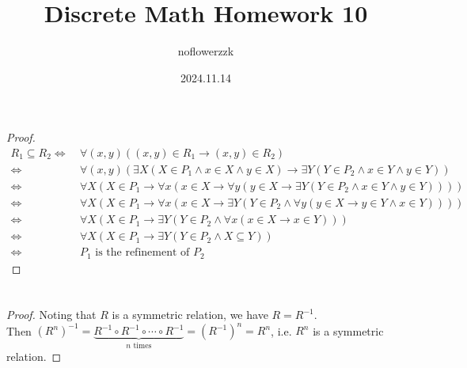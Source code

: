 \documentclass{article}
\title{Discrete Math Homework 10}
\author{noflowerzzk}
\date{2024.11.14}
\begin{document}
\maketitle

\section{}

\begin{proof}
    \begin{align*}
        R_1 \subseteq R_2 \Leftrightarrow\ & \forall (x, y)((x, y) \in R_1 \rightarrow (x, y) \in R_2) \\
        \Leftrightarrow\ & \forall (x, y)(\exists X(X\in P_1 \land x \in X \land y \in X) \rightarrow \exists Y(Y \in P_2 \land x \in Y \land y \in Y)) \\
        \Leftrightarrow\ & \forall X(X \in P_1 \rightarrow \forall x (x \in X \rightarrow \forall y(y \in X \rightarrow \exists Y(Y \in P_2 \land x \in Y \land y \in Y)))) \\
        \Leftrightarrow\ &  \forall X(X \in P_1 \rightarrow \forall x(x \in X \rightarrow \exists Y(Y \in P_2 \land \forall y(y \in X \rightarrow y \in Y \land x \in Y)))) \\
        \Leftrightarrow\ & \forall X(X \in P_1 \rightarrow \exists Y(Y \in P_2 \land \forall x (x \in X \rightarrow x \in Y))) \\
        \Leftrightarrow\ & \forall X(X \in P_1 \rightarrow \exists Y(Y \in P_2 \land X \subseteq Y)) \\
        \Leftrightarrow\ & P_1 \text{ is the refinement of } P_2
    \end{align*}
\end{proof}

\section{}

\begin{proof}
    Noting that $R$ is a symmetric relation, we have $R = R^{-1}$. \\
    Then $\left(R^n\right)^{-1} = \underbrace{R^{-1}\circ R^{-1}\circ \cdots \circ R^{-1}}_{n \text{ times}} = \left(R^{-1}\right)^n = R^n $, i.e. $R^n$ is a symmetric relation.
\end{proof}

\section{}
\end{document}
